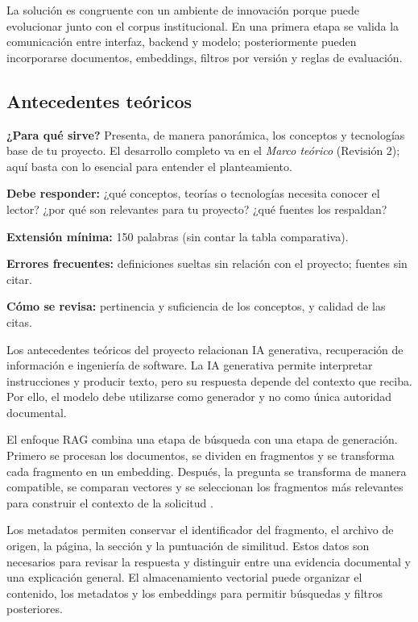 La solución es congruente con un ambiente de innovación porque puede evolucionar junto con el corpus institucional. En una primera etapa se valida la comunicación entre interfaz, backend y modelo; posteriormente pueden incorporarse documentos, embeddings, filtros por versión y reglas de evaluación.


\subsection{Antecedentes teóricos} \label{sec:antecedentes_teoricos} %

\begin{guia}
\textbf{¿Para qué sirve?} Presenta, de manera panorámica, los conceptos y tecnologías base de tu proyecto. El desarrollo
completo va en el \emph{Marco teórico} (Revisión 2); aquí basta con lo esencial para entender el planteamiento.

\textbf{Debe responder:} ¿qué conceptos, teorías o tecnologías necesita conocer el lector? ¿por qué son relevantes para
tu proyecto? ¿qué fuentes los respaldan?

\textbf{Extensión mínima:} 150 palabras (sin contar la tabla comparativa).

\textbf{Errores frecuentes:} definiciones sueltas sin relación con el proyecto; fuentes sin citar.

\textbf{Cómo se revisa:} pertinencia y suficiencia de los conceptos, y calidad de las citas.
\end{guia}

Los antecedentes teóricos del proyecto relacionan IA generativa, recuperación de información e ingeniería de software. La IA generativa permite interpretar instrucciones y producir texto, pero su respuesta depende del contexto que reciba. Por ello, el modelo debe utilizarse como generador y no como única autoridad documental.

El enfoque RAG combina una etapa de búsqueda con una etapa de generación. Primero se procesan los documentos, se dividen en fragmentos y se transforma cada fragmento en un embedding. Después, la pregunta se transforma de manera compatible, se comparan vectores y se seleccionan los fragmentos más relevantes para construir el contexto de la solicitud \cite{lewis2020rag,gao2023rag}.

Los metadatos permiten conservar el identificador del fragmento, el archivo de origen, la página, la sección y la puntuación de similitud. Estos datos son necesarios para revisar la respuesta y distinguir entre una evidencia documental y una explicación general. El almacenamiento vectorial puede organizar el contenido, los metadatos y los embeddings para permitir búsquedas y filtros posteriores.

